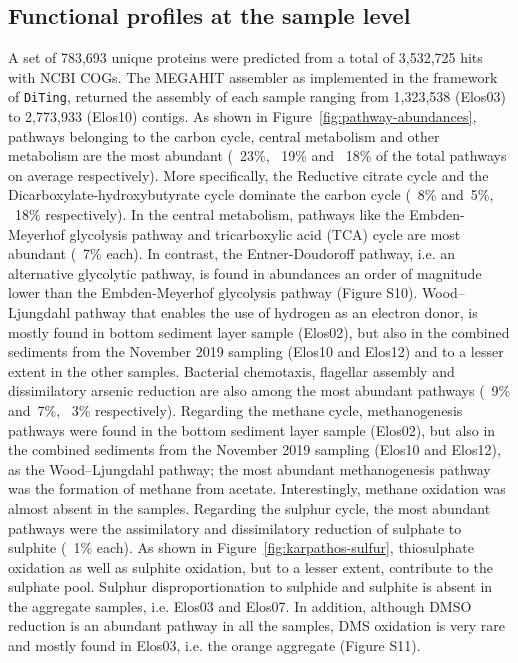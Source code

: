 \subsection{Functional profiles at the sample level}

   A set of 783,693 unique proteins were predicted from a total of 3,532,725 hits with NCBI COGs. 
   The MEGAHIT assembler as implemented in the framework of \texttt{DiTing}, returned the assembly of each sample 
   ranging from 1,323,538 (Elos03) to 2,773,933 (Elos10) contigs. 
   As shown in Figure~\ref{fig:pathway-abundances}, pathways belonging to the carbon cycle, central metabolism 
   and other metabolism are the most abundant (~23\%, ~19\% and ~18\% of the total pathways on average respectively). 
   More specifically, the Reductive citrate cycle and the Dicarboxylate-hydroxybutyrate cycle dominate the carbon cycle 
   (~8\% and~5\%, ~18\% respectively). 
   In the central metabolism, pathways like the Embden-Meyerhof glycolysis pathway and tricarboxylic acid (TCA) cycle 
   are most abundant (~7\% each). 
   In contrast, the Entner-Doudoroff pathway, i.e. an alternative glycolytic pathway, is found in abundances an order 
   of magnitude lower than the Embden-Meyerhof glycolysis pathway (Figure S10). 
   Wood–Ljungdahl pathway that enables the use of hydrogen as an electron donor, is mostly found in bottom sediment layer sample (Elos02), 
   but also in the combined sediments from the November 2019 sampling (Elos10 and Elos12) and to a lesser extent in the other samples. 
   Bacterial chemotaxis, flagellar assembly and dissimilatory arsenic reduction are also among the most abundant pathways (~9\% and~7\%, ~3\% respectively). 
   Regarding the methane cycle, methanogenesis pathways were found in the bottom sediment layer sample (Elos02), but also in the combined sediments 
   from the November 2019 sampling (Elos10 and Elos12), as the Wood–Ljungdahl pathway; 
   the most abundant methanogenesis pathway was the formation of methane from acetate. 
   Interestingly, methane oxidation was almost absent in the samples. 
   Regarding the sulphur cycle, the most abundant pathways were the assimilatory and dissimilatory reduction of sulphate to sulphite (~1\% each). 
   As shown in Figure~\ref{fig:karpathos-sulfur}, thiosulphate oxidation as well as sulphite oxidation, but to a lesser extent, contribute to the sulphate pool. 
   Sulphur disproportionation to sulphide and sulphite is absent in the aggregate samples, i.e. Elos03 and Elos07. In addition, although DMSO reduction is 
   an abundant pathway in all the samples, DMS oxidation is very rare and mostly found in Elos03, i.e. the orange aggregate (Figure S11).
